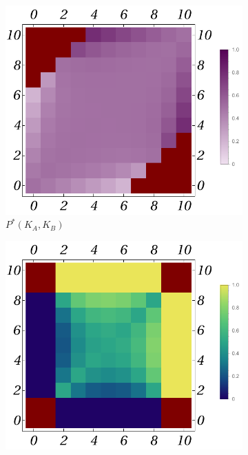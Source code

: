 \documentclass{article}
\theoremstyle{definition}
\begin{document}
\begin{figure}[H]
    \centering
    \begin{subfigure}[b]{0.3\textwidth}
        \includegraphics[width=\textwidth]{img/PB_Plot_4_10.pdf}
        \caption{$P^*(K_A,K_B)$}
        \label{fig:BGame4_10_P}
    \end{subfigure}
    \hfill %
    \begin{subfigure}[b]{0.3\textwidth}
        \includegraphics[width=\textwidth]{img/ppkB_Plot_4_10.pdf}

\end{subfigure}
\end{figure}
\end{document}
